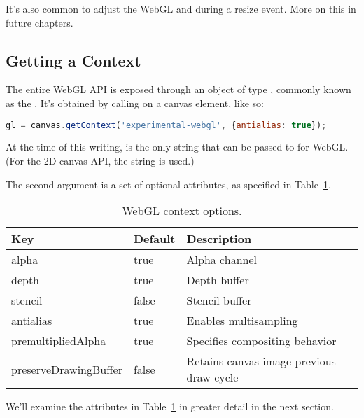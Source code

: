 \begin{sidenote}
It's also common to adjust the WebGL  and  during a resize event.  More on this in future chapters.
\end{sidenote}

\subsection{Getting a Context}
\label{sec:context}

The entire WebGL API is exposed through an object of type  , commonly known as the  .  It's obtained by calling   on a canvas element, like so:

\begin{lstlisting}[language=JavaScript]
  gl = canvas.getContext('experimental-webgl', {antialias: true});
\end{lstlisting}

At the time of this writing,   is the only string that can be passed to  for WebGL.  (For the 2D canvas API, the string  is used.)

The second argument is a set of optional attributes, as specified in Table~\ref{tab:ContextAttributes}.

\begin{table}[htb]\centering
  \begin{tabular}{lll}
    \hline
    Key & Default & Description \\
    \hline
    alpha & true & Alpha channel \\
    depth & true & Depth buffer \\
    stencil & false & Stencil buffer \\
    antialias & true & Enables multisampling \\
    premultipliedAlpha & true & Specifies compositing behavior \\
    preserveDrawingBuffer & false & Retains canvas image previous draw cycle \\
    \hline
  \end{tabular}
  \caption{WebGL context options.}
  \label{tab:ContextAttributes}
\end{table}

We'll examine the attributes in Table~\ref{tab:ContextAttributes} in greater detail in the next section.

